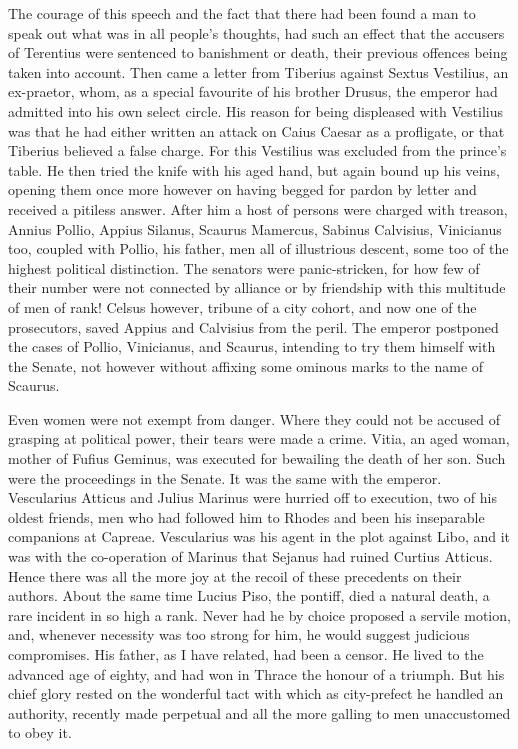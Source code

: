 The courage of this speech and the fact that there had been found a man to speak out what was in all people's thoughts, had such an effect that the accusers of Terentius were sentenced to banishment or death, their previous offences being taken into account. Then came a letter from Tiberius against Sextus Vestilius, an ex-praetor, whom, as a special favourite of his brother Drusus, the emperor had admitted into his own select circle. His reason for being displeased with Vestilius was that he had either written an attack on Caius Caesar as a profligate, or that Tiberius believed a false charge. For this Vestilius was excluded from the prince's table. He then tried the knife with his aged hand, but again bound up his veins, opening them once more however on having begged for pardon by letter and received a pitiless answer. After him a host of persons were charged with treason, Annius Pollio, Appius Silanus, Scaurus Mamercus, Sabinus Calvisius, Vinicianus too, coupled with Pollio, his father, men all of illustrious descent, some too of the highest political distinction. The senators were panic-stricken, for how few of their number were not connected by alliance or by friendship with this multitude of men of rank! Celsus however, tribune of a city cohort, and now one of the prosecutors, saved Appius and Calvisius from the peril. The emperor postponed the cases of Pollio, Vinicianus, and Scaurus, intending to try them himself with the Senate, not however without affixing some ominous marks to the name of Scaurus.


Even women were not exempt from danger. Where they could not be accused of grasping at political power, their tears were made a crime. Vitia, an aged woman, mother of Fufius Geminus, was executed for bewailing the death of her son. Such were the proceedings in the Senate. It was the same with the emperor. Vescularius Atticus and Julius Marinus were hurried off to execution, two of his oldest friends, men who had followed him to Rhodes and been his inseparable companions at Capreae. Vescularius was his agent in the plot against Libo, and it was with the co-operation of Marinus that Sejanus had ruined Curtius Atticus. Hence there was all the more joy at the recoil of these precedents on their authors. About the same time Lucius Piso, the pontiff, died a natural death, a rare incident in so high a rank. Never had he by choice proposed a servile motion, and, whenever necessity was too strong for him, he would suggest judicious compromises. His father, as I have related, had been a censor. He lived to the advanced age of eighty, and had won in Thrace the honour of a triumph. But his chief glory rested on the wonderful tact with which as city-prefect he handled an authority, recently made perpetual and all the more galling to men unaccustomed to obey it.

